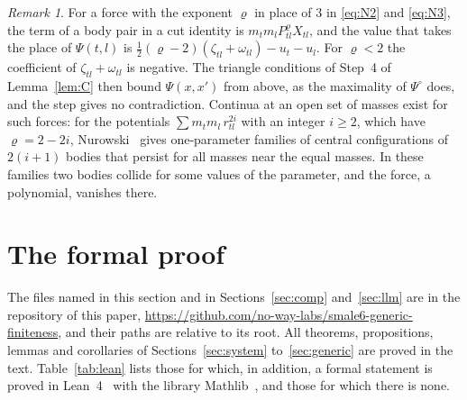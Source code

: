 \documentclass[11pt]{amsart}
\theoremstyle{definition}
\theoremstyle{remark}
\newtheorem{remark}[theorem]{Remark}
\numberwithin{equation}{section}
\newcommand{\repourl}{https://github.com/no-way-labs/smale6-generic-finiteness}
\newcommand{\Po}{\Psi^{\circ}}
\begin{document}
\begin{remark}\label{rem:exponent}
For a force with the exponent $\varrho$ in place of $3$ in \eqref{eq:N2} and \eqref{eq:N3}, the term
of a body pair in a cut identity is $m_t m_l P_{tl}^{\varrho} X_{tl}$, and the value that takes the
place of $\Psi(t, l)$ is $\tfrac12 (\varrho - 2)(\zeta_{tl} + \omega_{tl}) - u_t - u_l$. For
$\varrho < 2$ the coefficient of $\zeta_{tl} + \omega_{tl}$ is negative. The triangle conditions of
Step~4 of Lemma~\ref{lem:C} then bound $\Psi(x, x')$ from above, as the maximality of $\Po$ does, and
the step gives no contradiction. Continua at an open set of masses exist for such forces: for the
potentials $\sum m_t m_l\, r_{tl}^{2i}$ with an integer $i \ge 2$, which have $\varrho = 2 - 2i$,
Nurowski~\cite{nurowski2026} gives one-parameter families of central configurations of $2(i + 1)$
bodies that persist for all masses near the equal masses. In these
families two bodies collide for some values of the parameter, and the force, a polynomial, vanishes
there.
\end{remark}

\section{The formal proof}\label{sec:lean}

The files named in this section and in Sections~\ref{sec:comp} and~\ref{sec:llm} are in the repository
of this paper, \url{\repourl}, and their paths are relative to its root.
All theorems, propositions, lemmas and corollaries of Sections~\ref{sec:system} to~\ref{sec:generic} are
proved in the text. Table~\ref{tab:lean} lists those for which, in addition, a formal statement is
proved in Lean~4~\cite{lean4} with the library Mathlib~\cite{mathlib}, and those for which there is
none.
\end{document}
